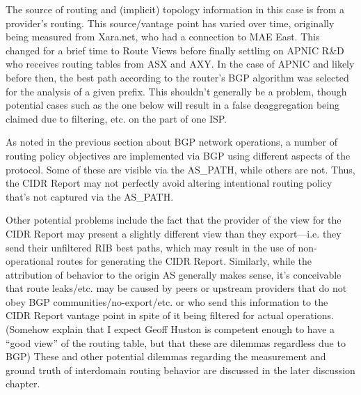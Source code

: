 The source of routing and (implicit) topology information in this case is from
a provider's routing. This source/vantage point has varied over time,
originally being measured from Xara.net, who had a connection to MAE East. This
changed for a brief time to Route Views before finally settling on APNIC R\&D
who receives routing tables from ASX and AXY. In the case of APNIC and likely
before then, the best path according to the router's BGP algorithm was selected
for the analysis of a given prefix. This shouldn't generally be a problem,
though potential cases such as the one below will result in a false
deaggregation being claimed due to filtering, etc. on the part of one ISP.

%
%
%
%
%
%
%

As noted in the previous section about BGP network operations, a number of
routing policy objectives are implemented via BGP using different aspects of
the protocol. Some of these are visible via the AS\_PATH, while others are not.
Thus, the CIDR Report may not perfectly avoid altering intentional routing
policy that's not captured via the AS\_PATH.

Other potential problems include the fact that the provider of the view for the
CIDR Report may present a slightly different view than they export---i.e. they
send their unfiltered RIB best paths, which may result in the use of
non-operational routes for generating the CIDR Report. Similarly, while the
attribution of behavior to the origin AS generally makes sense, it's
conceivable that route leaks/etc. may be caused by peers or upstream providers
that do not obey BGP communities/no-export/etc. or who send this information to
the CIDR Report vantage point in spite of it being filtered for actual
operations. (Somehow explain that I expect Geoff Huston is competent enough to
have a ``good view'' of the routing table, but that these are dilemmas
regardless due to BGP) These and other potential dilemmas regarding the
measurement and ground truth of interdomain routing behavior are discussed in
the later discussion chapter.


